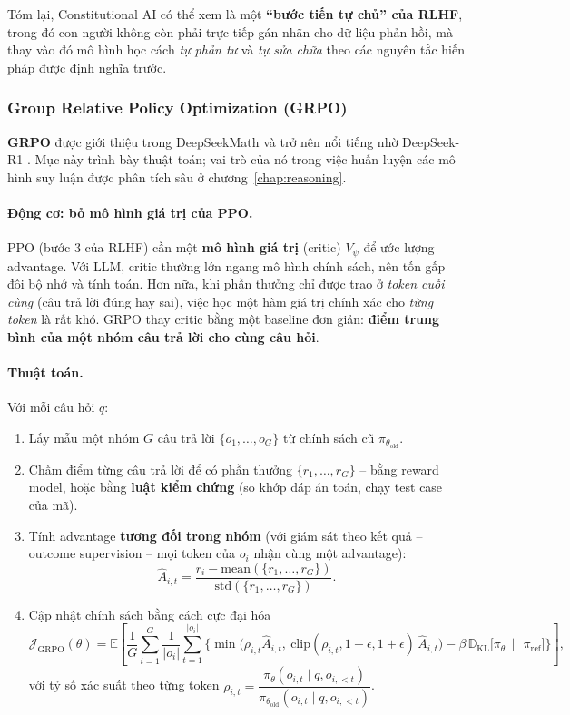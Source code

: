 \noindent
Tóm lại, Constitutional AI có thể xem là một \textbf{“bước tiến tự chủ” của RLHF}, trong đó con người không còn phải trực tiếp gán nhãn cho dữ liệu phản hồi, mà thay vào đó mô hình học cách \emph{tự phản tư} và \emph{tự sửa chữa} theo các nguyên tắc hiến pháp được định nghĩa trước.

\subsubsection{Group Relative Policy Optimization (GRPO) \newtag}
\label{ssec:grpo}

\textbf{GRPO} được giới thiệu trong DeepSeekMath \cite{shao2024deepseekmath} và trở nên nổi tiếng nhờ DeepSeek-R1 \cite{deepseekai2025r1}. Mục này trình bày thuật toán; vai trò của nó trong việc huấn luyện các mô hình suy luận được phân tích sâu ở chương~\ref{chap:reasoning}.

\paragraph{Động cơ: bỏ mô hình giá trị của PPO.}
PPO (bước 3 của RLHF) cần một \textbf{mô hình giá trị} (critic) $V_\psi$ để ước lượng advantage. Với LLM, critic thường lớn ngang mô hình chính sách, nên tốn gấp đôi bộ nhớ và tính toán. Hơn nữa, khi phần thưởng chỉ được trao ở \emph{token cuối cùng} (câu trả lời đúng hay sai), việc học một hàm giá trị chính xác cho \emph{từng token} là rất khó. GRPO thay critic bằng một baseline đơn giản: \textbf{điểm trung bình của một nhóm câu trả lời cho cùng câu hỏi}.

\paragraph{Thuật toán.} Với mỗi câu hỏi $q$:
\begin{enumerate}
	\item Lấy mẫu một nhóm $G$ câu trả lời $\{o_1, \dots, o_G\}$ từ chính sách cũ $\pi_{\theta_{\text{old}}}$.
	\item Chấm điểm từng câu trả lời để có phần thưởng $\{r_1, \dots, r_G\}$ -- bằng reward model, hoặc bằng \textbf{luật kiểm chứng} (so khớp đáp án toán, chạy test case của mã).
	\item Tính advantage \textbf{tương đối trong nhóm} (với giám sát theo kết quả -- outcome supervision -- mọi token của $o_i$ nhận cùng một advantage):
	\[
	\hat{A}_{i,t} = \frac{r_i - \text{mean}(\{r_1,\dots,r_G\})}{\text{std}(\{r_1,\dots,r_G\})}.
	\]
	\item Cập nhật chính sách bằng cách cực đại hóa
	\[
	\mathcal{J}_{\text{GRPO}}(\theta) = \mathbb{E}\left[\frac{1}{G}\sum_{i=1}^{G}\frac{1}{|o_i|}\sum_{t=1}^{|o_i|}\Big\{\min\big(\rho_{i,t}\hat{A}_{i,t},\ \text{clip}(\rho_{i,t}, 1-\epsilon, 1+\epsilon)\,\hat{A}_{i,t}\big) - \beta\, \mathbb{D}_{\text{KL}}\big[\pi_\theta \,\|\, \pi_{\text{ref}}\big]\Big\}\right],
	\]
	với tỷ số xác suất theo từng token $\rho_{i,t} = \dfrac{\pi_\theta(o_{i,t}\mid q, o_{i,<t})}{\pi_{\theta_{\text{old}}}(o_{i,t}\mid q, o_{i,<t})}$.
\end{enumerate}

